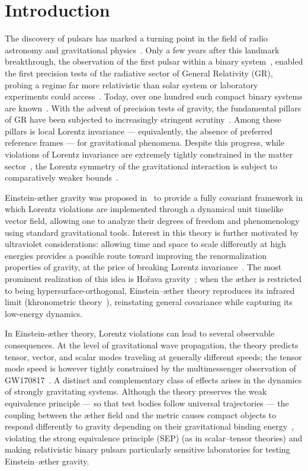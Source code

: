 \documentclass[
    floats,
    floatfix,
    amssymb,
    prd,
    twocolumn,
    superscriptaddress,
    nofootinbib,
    unicode,
    colorlinks=true,
    linktocpage=true
]{revtex4-2}
\begin{document}
\section{Introduction}
The discovery of pulsars has marked a turning point in the field of radio astronomy and gravitational physics~\cite{Hewish:1968bj}. Only a few years after this landmark breakthrough, the observation of the first pulsar within a binary system~\cite{Hulse:1974eb}, enabled the first precision tests of the radiative sector of General Relativity (GR), probing a regime far more relativistic than solar system or laboratory experiments could access~\cite{Taylor:1982zz}. Today, over one hundred such compact binary systems are known~\cite{Manchester:2004bp}. 
With the advent of precision tests of gravity, the fundamental pillars of GR have been subjected to increasingly stringent scrutiny~\cite{Will:2014kxa, Berti:2015itd}. Among these pillars is local Lorentz invariance — equivalently, the absence of preferred reference frames — for gravitational phenomena. Despite this progress, while violations of Lorentz invariance are extremely tightly constrained in the matter sector~\cite{Kostelecky:2003fs, Kostelecky:2008ts}, the Lorentz symmetry of the gravitational interaction is subject to comparatively weaker bounds~\cite{Mattingly:2005re, Will:2014kxa}.

Einstein-\ae ther gravity was proposed in~\cite{Jacobson:2000xp} to provide a fully covariant framework in which Lorentz violations are implemented through a dynamical unit timelike vector field, allowing one to analyze their degrees of freedom and phenomenology using standard gravitational tools. Interest in this theory is further motivated by ultraviolet considerations: allowing time and space to scale differently at high energies provides a possible route toward improving the renormalization properties of gravity, at the price of breaking Lorentz invariance~\cite{Anselmi:2007ri, Horava:2009uw}. The most prominent realization of this idea is Ho\v{r}ava gravity~\cite{Horava:2009uw}; when the \ae ther is restricted to being hypersurface-orthogonal, Einstein--\ae ther theory reproduces its infrared limit (khronometric theory~\cite{Blas:2010hb}), reinstating general covariance while capturing its low-energy dynamics.

In Einstein-\ae ther theory, Lorentz violations can lead to several observable consequences. At the level of gravitational wave propagation, the theory predicts tensor, vector, and scalar modes traveling at generally different speeds; the tensor mode speed is however tightly constrained by the multimessenger observation of GW170817~\cite{Monitor:2017mdv}. A distinct and complementary class of effects arises in the dynamics of strongly gravitating systems. Although the theory preserves the weak equivalence principle — so that test bodies follow universal trajectories — the coupling between the \ae ther field and the metric causes compact objects to respond differently to gravity depending on their gravitational binding energy~\cite{Foster:2007gr,Yagi:2013qpa,Yagi_2014,Barausse:2019yuk,Gupta_2021}, violating the strong equivalence principle (SEP) (as in scalar--tensor theories) and making relativistic binary pulsars particularly sensitive laboratories for testing Einstein--\ae ther gravity.
\end{document}
